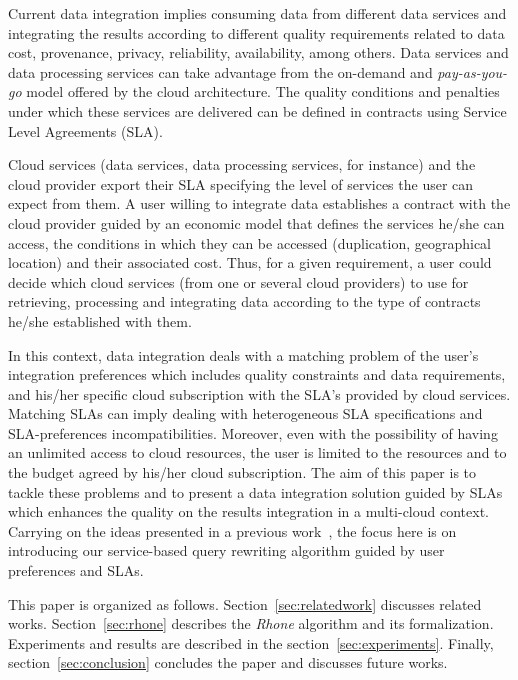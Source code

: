 Current data integration implies consuming data from different data services and
integrating the results according to different quality requirements related to
data cost, provenance, privacy, reliability, availability, among others. Data
services and data processing services can take advantage from the on-demand and
\textit{pay-as-you-go} model offered by the cloud architecture. The quality
conditions and penalties under which these services are delivered can be defined in
contracts using Service Level Agreements (SLA).        

Cloud services (data services, data processing services, for instance) and the
cloud provider export their SLA specifying the level of services the user can
expect from them. A user willing to integrate data establishes a contract with
the cloud provider guided by an economic model that defines the services he/she can
access, the conditions in which they can be accessed (duplication, geographical
location) and their associated cost. Thus, for a given requirement, a user could
decide which cloud services (from one or several cloud providers) to use for
retrieving, processing and integrating data according to the type of contracts
he/she established with them.         

In this context, data integration deals with a matching problem of the user's
integration preferences which includes quality constraints and data
requirements, and his/her specific cloud subscription with the SLA's provided by
cloud services. Matching SLAs can imply dealing with heterogeneous SLA
specifications and SLA-preferences incompatibilities. Moreover, even with
the possibility of having an unlimited access to cloud resources, the user is
limited to the resources and to the budget agreed by his/her cloud subscription. The
aim of this paper is to tackle these problems and to present a data integration solution guided by SLAs which enhances the quality on the results integration in a multi-cloud context. 
Carrying on the ideas presented in a previous work~\cite{Bennani2014}, the focus here is on introducing our service-based query rewriting algorithm guided by user preferences and SLAs. 

This paper is organized as follows. 
Section~\ref{sec:relatedwork} discusses related works.
Section~\ref{sec:rhone} describes the \textit{Rhone} algorithm and its formalization. Experiments and results are described in the section~\ref{sec:experiments}. 
Finally, section~\ref{sec:conclusion} concludes the paper and discusses future works.

